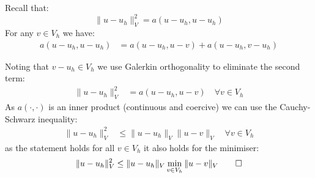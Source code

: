 Recall that:
\[
    \|u - u_h\|_V^2 = a(u - u_h, u - u_h)
\]
For any $v \in V_h$ we have:
\begin{align*}
    a(u - u_h, u - u_h) & = a(u - u_h, u - v) + a(u - u_h, v - u_h)
\end{align*}

Noting that $v - u_h \in V_h$ we use Galerkin orthogonality to eliminate the second term:
\begin{align*}
    \|u - u_h\|_V^2 & = a(u - u_h, u - v) \quad \forall v \in V_h
\end{align*}
As $a(\cdot, \cdot)$ is an inner product (continuous and coercive) we can use the Cauchy-Schwarz inequality:
\begin{align*}
    \|u - u_h\|_V^2 & \leq \|u - u_h\|_V \|u - v\|_V \quad \forall v \in V_h
\end{align*}
as the statement holds for all $v \in V_h$ it also holds for the minimiser:
\[\|u - u_h\|_V^2 \leq \|u - u_h\|_V \min_{v \in V_h} \|u - v\|_V \qed\]

